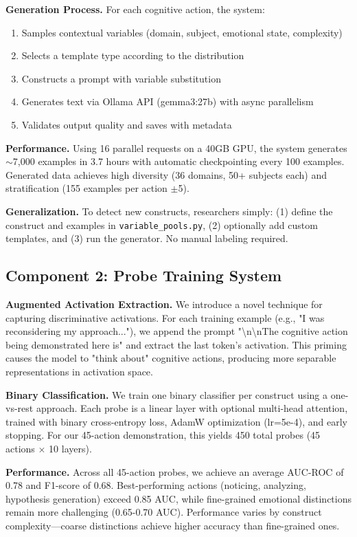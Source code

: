 \documentclass[letterpaper]{article}
\begin{document}
\textbf{Generation Process.} For each cognitive action, the system:
\begin{enumerate}
\item Samples contextual variables (domain, subject, emotional state, complexity)
\item Selects a template type according to the distribution
\item Constructs a prompt with variable substitution
\item Generates text via Ollama API (gemma3:27b) with async parallelism
\item Validates output quality and saves with metadata
\end{enumerate}

\textbf{Performance.} Using 16 parallel requests on a 40GB GPU, the system generates $\sim$7,000 examples in 3.7 hours with automatic checkpointing every 100 examples. Generated data achieves high diversity (36 domains, 50+ subjects each) and stratification (155 examples per action $\pm$5).

\textbf{Generalization.} To detect new constructs, researchers simply: (1) define the construct and examples in \texttt{variable\_pools.py}, (2) optionally add custom templates, and (3) run the generator. No manual labeling required.

\subsection{Component 2: Probe Training System}

\textbf{Augmented Activation Extraction.} We introduce a novel technique for capturing discriminative activations. For each training example (e.g., "I was reconsidering my approach..."), we append the prompt "\textbackslash n\textbackslash nThe cognitive action being demonstrated here is" and extract the last token's activation. This priming causes the model to "think about" cognitive actions, producing more separable representations in activation space.

\textbf{Binary Classification.} We train one binary classifier per construct using a one-vs-rest approach. Each probe is a linear layer with optional multi-head attention, trained with binary cross-entropy loss, AdamW optimization (lr=5e-4), and early stopping. For our 45-action demonstration, this yields 450 total probes (45 actions $\times$ 10 layers).

\textbf{Performance.} Across all 45-action probes, we achieve an average AUC-ROC of 0.78 and F1-score of 0.68. Best-performing actions (noticing, analyzing, hypothesis generation) exceed 0.85 AUC, while fine-grained emotional distinctions remain more challenging (0.65-0.70 AUC). Performance varies by construct complexity—coarse distinctions achieve higher accuracy than fine-grained ones.
\end{document}
